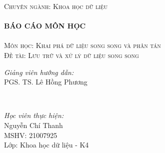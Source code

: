 \documentclass[14pt, a4paper]{article}
\numberwithin{equation}{section}
\numberwithin{figure}{section}
\numberwithin{dl}{section}
\numberwithin{md}{section}
\numberwithin{bd}{section}
\numberwithin{dn}{section}
\numberwithin{hq}{section}
\begin{document}
\begin{titlepage}
    \textsc{\Large Chuyên ngành: Khoa học dữ liệu}\\[0.5cm] %



    \HRule \\[0.4cm]
    { \huge \bfseries BÁO CÁO MÔN HỌC}\\[0.4cm] %
    \HRule \\[1.5cm]

    \textsc{\Large Môn học: Khai phá dữ liệu song song và phân tán}\\[1cm] %


    \textsc{\Large Đề tài: Lưu trữ và xử lý dữ liệu song song}\\[1cm]


    \begin{minipage}{0.4\textwidth}
        \begin{flushleft} \large
        \emph{Giảng viên hướng dẫn:} \\
        PGS. TS. Lê Hồng Phương %
        \end{flushleft}
    \end{minipage}\\[0.5cm]

    \begin{minipage}{0.4\textwidth}
    \begin{flushleft} \large
    \emph{Học viên thực hiện:}\\
    Nguyễn Chí Thanh \\
    MSHV: 21007925 \\ %
    Lớp: Khoa học dữ liệu - K4
    \end{flushleft}
    \end{minipage}





\end{titlepage}
\end{document}
